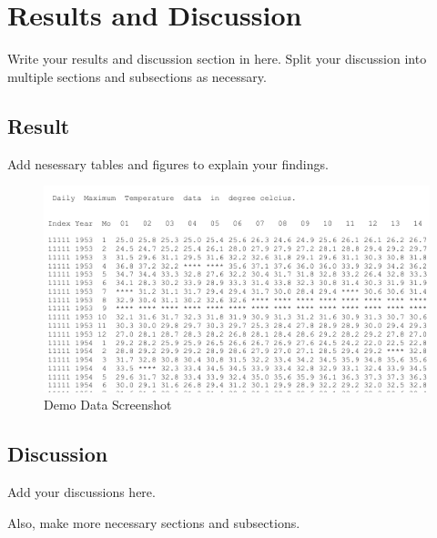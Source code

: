\chapter{Results and Discussion}\label{Results and Discussion}
Write your results and discussion section in here. Split your discussion into multiple sections and subsections as necessary.
\section{Result}
Add nesessary tables and figures to explain your findings.



\begin{figure}[h]
    \centering
    \includegraphics[width=.75\textwidth]{figures/demoFigure2.png}
    \caption{Demo Data Screenshot}
    \label{fig:dataDemo2}
\end{figure}

\section{Discussion}

Add your discussions here. 

Also, make more necessary sections and subsections.

\lipsum[3-15]